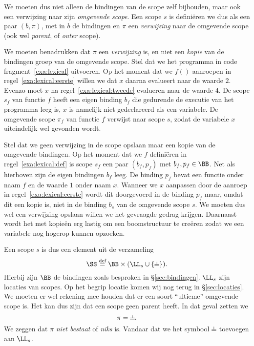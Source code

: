 We moeten dus niet alleen de bindingen van de scope zelf bijhouden, maar ook een verwijzing naar zijn \emph{omgevende scope}. Een scope $s$ is definiëren we dus als een paar $(b,\pi)$, met in $b$ de bindingen en $\pi$ een \emph{verwijzing} naar de omgevende scope (ook wel \emph{parent}, of \emph{outer} scope).

We moeten benadrukken dat $\pi$ een \emph{verwijzing} is, en niet een \emph{kopie} van de bindingen groep van de omgevende scope. Stel dat we het programma in code fragment~\ref{exa:lexical} uitvoeren. Op het moment dat we $f()$ aanroepen in regel~\ref{exa:lexical:eerste} willen we dat $x$ daarna evalueert naar de waarde $2$. Evenzo moet $x$ na regel~\ref{exa:lexical:tweede} evalueren naar de waarde $4$. De scope $s_f$ van functie $f$ heeft een eigen binding $b_f$ die gedurende de executie van het programma leeg is, $x$ is namelijk niet gedeclareerd als een \LOCAL variabele. De omgevende scope $\pi_f$ van functie $f$ verwijst naar scope $s$, zodat de variabele $x$ uiteindelijk wel gevonden wordt.

\codeFragmentCaption
{}

Stel dat we geen verwijzing in de scope opslaan maar een kopie van de omgevende bindingen. Op het moment dat we $f$ definiëren in regel~\ref{exa:lexical:def} is scope $s_f$ een paar $(b_f,p_f)$ met $b_f,p_f\in\BB$. Net als hierboven zijn de eigen bindingen $b_f$ leeg. De binding $p_f$ bevat een functie onder naam $f$ en de waarde $1$ onder naam $x$. Wanneer we $x$ aanpassen door de aanroep in regel~\ref{exa:lexical:eerste} wordt dit doorgevoerd in de binding $p_f$ maar, omdat dit een kopie is, niet in de binding $b_s$ van de omgevende scope $s$. We moeten dus wel een verwijzing opslaan willen we het gevraagde gedrag krijgen. Daarnaast wordt het met kopieën erg lastig om een boomstructuur te creëren zodat we een variabele nog hogerop kunnen opzoeken.

Een scope $s$ is dus een element uit de verzameling
\begin{equation*}
  \SS \DEF \BB \times (\LL_s \cup \{\nil\}).
\end{equation*}
Hierbij zijn $\BB$ de bindingen zoals besproken in §\ref{sec:bindingen}. $\LL_s$ zijn locaties van scopes. Op het begrip locatie komen wij nog terug in §\ref{sec:locaties}. We moeten er wel rekening mee houden dat er een soort ``ultieme'' omgevende scope is. Het kan dus zijn dat een scope geen parent heeft. In dat geval zetten we
\begin{equation*}
  \pi = \nil.
\end{equation*}
We zeggen dat $\pi$ \emph{niet bestaat} of \emph{niks} is. Vandaar dat we het symbool $\nil$ toevoegen aan $\LL_s$.

